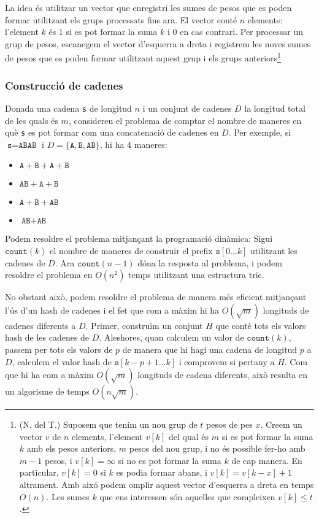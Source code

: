 La idea és utilitzar un vector que enregistri les sumes de pesos que
es poden formar utilitzant els grups processats fins ara. El vector
conté $n$ elements: l'element $k$ és 1 si es pot formar la suma $k$ i
0 en cas contrari. Per processar un grup de pesos, escanegem el vector
d'esquerra a dreta i registrem les noves sumes de pesos que es poden
formar utilitzant aquest grup i els grups anteriors\footnote{(N. del
T.)  Suposem que tenim un nou grup de $t$ pesos de pes $x$. Creem
un vector $v$ de $n$ elements, l'element $v[k]$ del qual és $m$ si es
pot formar la suma $k$ amb els pesos anteriors, $m$ pesos del
nou grup, i no és possible fer-ho amb $m-1$ pesos, i $v[k]=\infty$ si no
es pot formar la suma $k$ de cap manera.  En particular, $v[k] = 0$ si
$k$ es podia formar abans, i $v[k]=v[k-x]+1$ altrament. Amb aixó podem
omplir aquest vector d'esquerra a dreta en temps $O(n)$. Les sumes $k$ que
ens interessen són aquelles que compleixen $v[k]\le t$.}

\subsubsection{Construcció de cadenes}

Donada una cadena \texttt{s} de longitud $n$ i un conjunt de cadenes
$D$ la longitud total de les quals és $m$, considereu el problema de
comptar el nombre de maneres en què \texttt{s} es pot formar com una
concatenació de cadenes en $D$. Per exemple, si
$\texttt{s}=\texttt{ABAB}$ i
$D=\{\texttt{A},\texttt{B},\texttt{AB}\}$, hi ha 4 maneres:


\begin{itemize}[noitemsep]
\item $\texttt{A}+\texttt{B}+\texttt{A}+\texttt{B}$
\item $\texttt{AB}+\texttt{A}+\texttt{B}$
\item $\texttt{A}+\texttt{B}+\texttt{AB}$
\item $\texttt{AB}+\texttt{AB}$
\end{itemize}


Podem resoldre el problema mitjançant la programació dinàmica: Sigui
$\texttt{count}(k)$ el nombre de maneres de construir el
prefix $\texttt{s}[0 \ldots k]$ utilitzant les cadenes de $D$. Ara
$\texttt{count}(n-1)$ dóna la resposta al problema, i podem resoldre
el problema en $O(n^2)$ temps utilitzant una estructura trie.

No obstant això, podem resoldre el problema de manera més eficient
mitjançant l'ús d'un hash de cadenes i el fet que com a màxim hi ha
$O(\sqrt m)$ longituds de cadenes diferents a $D$. Primer, construïm
un conjunt $H$ que conté tots els valors hash de les cadenes de
$D$. Aleshores, quan calculem un valor de $\texttt{count}(k)$, passem
per tots els valors de $p$ de manera que hi hagi una cadena de
longitud $p$ a $D$, calculem el valor hash de
$\texttt{s}[k-p+1\ldots k]$ i comprovem si pertany a $H$. Com que hi ha
com a màxim $O(\sqrt m)$ longituds de cadena diferents, això resulta en un
algorisme de temps $O(n \sqrt m)$.

